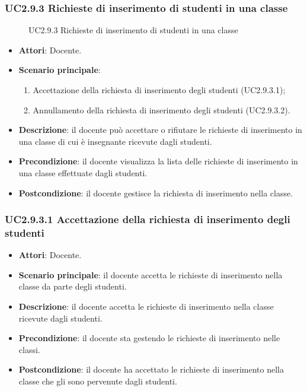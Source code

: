 \subsubsection{UC2.9.3 Richieste di inserimento di studenti in una classe}
\begin{figure}[H]
\centering
\noindent{}
\caption{UC2.9.3 Richieste di inserimento di studenti in una classe}
\end{figure}
\begin{itemize}
\item \textbf{Attori}: Docente.
\item \textbf{Scenario principale}:
\begin{enumerate}
\item Accettazione della richiesta di inserimento degli studenti (UC2.9.3.1);
\item Annullamento della richiesta di inserimento degli studenti (UC2.9.3.2).
\end{enumerate}
\item \textbf{Descrizione}: il docente può accettare o rifiutare le richieste di inserimento in una classe di cui è insegnante ricevute dagli studenti.
\item \textbf{Precondizione}: il docente visualizza la lista delle richieste di inserimento in una classe effettuate dagli studenti.
\item \textbf{Postcondizione}: il docente gestisce la richiesta di inserimento nella classe.
\end{itemize}
\subsubsection{UC2.9.3.1 Accettazione della richiesta di inserimento degli studenti}
\begin{itemize}
\item \textbf{Attori}: Docente.
\item \textbf{Scenario principale}: il docente accetta le richieste di inserimento nella classe da parte degli studenti.
\item \textbf{Descrizione}: il docente accetta le richieste di inserimento nella classe ricevute dagli studenti.
\item \textbf{Precondizione}: il docente sta gestendo le richieste di inserimento nelle classi.
\item \textbf{Postcondizione}: il docente ha accettato le richieste di inserimento nella classe che gli sono pervenute dagli studenti.
\end{itemize}
